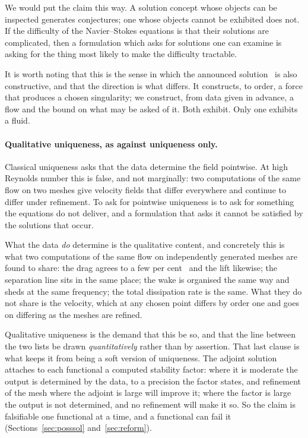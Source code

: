 \documentclass[11pt]{article}
\begin{document}
We would put the claim this way. A solution concept whose objects can be inspected generates
conjectures; one whose objects cannot be exhibited does not. If the difficulty of the Navier--Stokes
equations is that their solutions are complicated, then a formulation which asks for solutions one can
examine is asking for the thing most likely to make the difficulty tractable.

It is worth noting that this is the sense in which the announced
solution~\cite{openai} is also constructive, and that the direction is what differs. It constructs,
to order, a force that produces a chosen singularity; we construct, from data given in advance, a
flow and the bound on what may be asked of it. Both exhibit. Only one exhibits a fluid.

\paragraph{Qualitative uniqueness, as against uniqueness only.} Classical uniqueness asks that the data determine the field
pointwise. At high Reynolds number this is false, and not marginally: two computations of the same
flow on two meshes give velocity fields that differ everywhere and continue to differ under
refinement. To ask for pointwise uniqueness is to ask for something the equations do not deliver, and
a formulation that asks it cannot be satisfied by the solutions that occur.

What the data \emph{do} determine is the qualitative content, and concretely this is what two
computations of the same flow on independently generated meshes are found to share: the drag agrees to
a few per cent~\cite{drag} and the lift likewise; the separation line sits in the same place; the wake is
organised the same way and sheds at the same frequency; the total dissipation rate is the same. What
they do not share is the velocity, which at any chosen point differs by order one and goes on
differing as the meshes are refined.

Qualitative uniqueness is the demand that this be so, and that the line between the two lists be
drawn \emph{quantitatively} rather than by assertion. That last clause is what keeps it from being a
soft version of uniqueness. The adjoint solution attaches to each functional a computed stability
factor: where it is moderate the output is determined by the data, to a precision the factor states,
and refinement of the mesh where the adjoint is large will improve it; where the factor is large the
output is not determined, and no refinement will make it so. So the claim is falsifiable one
functional at a time, and a functional can fail it
(Sections~\ref{sec:posssol} and~\ref{sec:reform}).
\end{document}
